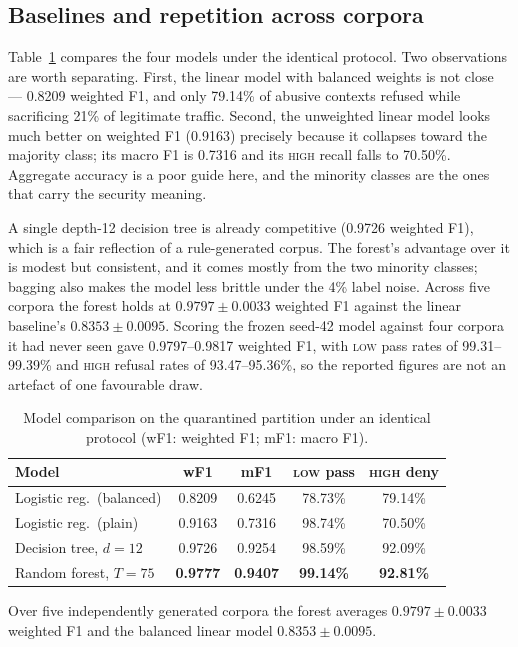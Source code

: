 \documentclass[a4paper,conference]{IEEEtran}
\newcommand{\HIGH}{\textsc{high}}
\newcommand{\LOW}{\textsc{low}}
\begin{document}
\subsection{Baselines and repetition across corpora}

Table~\ref{tab:baselines} compares the four models under the identical protocol. Two
observations are worth separating. First, the linear model with balanced weights is not
close --- 0.8209 weighted F1, and only 79.14\% of abusive contexts refused while sacrificing
21\% of legitimate traffic. Second, the unweighted linear model looks much better on weighted F1
(0.9163) precisely because it collapses toward the majority class; its macro F1 is 0.7316 and its
\HIGH{} recall falls to 70.50\%. Aggregate accuracy is a poor guide here, and the minority
classes are the ones that carry the security meaning.

A single depth-12 decision tree is already competitive (0.9726 weighted F1), which is a fair
reflection of a rule-generated corpus. The forest's advantage over it is modest but consistent,
and it comes mostly from the two minority classes; bagging also makes the model less brittle
under the 4\% label noise. Across five corpora the forest holds at $0.9797 \pm 0.0033$ weighted
F1 against the linear baseline's $0.8353 \pm 0.0095$. Scoring the frozen seed-42 model against
four corpora it had never seen gave 0.9797--0.9817 weighted F1, with \LOW{} pass rates of
99.31--99.39\% and \HIGH{} refusal rates of 93.47--95.36\%, so the reported figures are not an
artefact of one favourable draw.

\begin{table}[t]
\caption{Model comparison on the quarantined partition under an identical protocol
(wF1: weighted F1; mF1: macro F1).}
\label{tab:baselines}
\centering
\footnotesize
\setlength{\tabcolsep}{4pt}
\begin{tabular}{@{}lcccc@{}}
\toprule
Model & wF1 & mF1 & \LOW{} pass & \HIGH{} deny \\
\midrule
Logistic reg.\ (balanced) & 0.8209 & 0.6245 & 78.73\% & 79.14\% \\
Logistic reg.\ (plain) & 0.9163 & 0.7316 & 98.74\% & 70.50\% \\
Decision tree, $d{=}12$ & 0.9726 & 0.9254 & 98.59\% & 92.09\% \\
Random forest, $T{=}75$ & \textbf{0.9777} & \textbf{0.9407} & \textbf{99.14\%} & \textbf{92.81\%} \\
\bottomrule
\end{tabular}

\smallskip
\parbox{\columnwidth}{\scriptsize Over five independently generated corpora the forest averages
$0.9797 \pm 0.0033$ weighted F1 and the balanced linear model $0.8353 \pm 0.0095$.}
\end{table}
\end{document}
